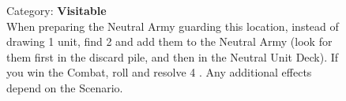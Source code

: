 \begin{figure}[H]
  \begin{minipage}[t]{0.47\textwidth}
    \vspace{0pt}
    \centering
    \caption{\small Category: \textbf{Visitable}\\
      Take a Spell Scroll card from its Deck and place it next to your Hero Board.
      Draw two Spells and place them face-down at the Spell Scroll card.
      You can use these Spells \protect{}.
    }
  \end{minipage}\hfill
  \begin{minipage}[t]{0.47\textwidth}
    \vspace{0pt}
    \centering
    \caption{\small Category: \textbf{Visitable}\\
      When preparing the Neutral Army guarding this location, instead of drawing 1  unit, find 2  \protect{} and add them to the Neutral Army (look for them first in the  discard pile, and then in the  Neutral Unit Deck).
      If you win the Combat, roll and resolve 4 .
      Any additional effects depend on the Scenario.
    }
  \end{minipage}
\end{figure}

